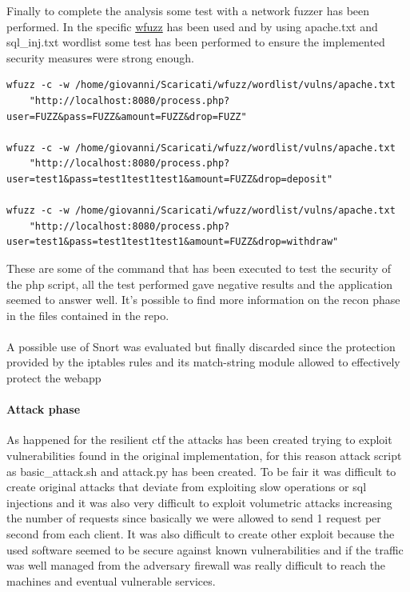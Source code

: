 \documentclass[14pt]{article}
\begin{document}
Finally to complete the analysis some test with a network fuzzer has been performed. In the specific \href{https://github.com/xmendez/wfuzz}{wfuzz} has been used and by using apache.txt and sql\_inj.txt wordlist some test has been performed to ensure the implemented security measures were strong enough. 
\begin{verbatim}
wfuzz -c -w /home/giovanni/Scaricati/wfuzz/wordlist/vulns/apache.txt 
	"http://localhost:8080/process.php?user=FUZZ&pass=FUZZ&amount=FUZZ&drop=FUZZ"

wfuzz -c -w /home/giovanni/Scaricati/wfuzz/wordlist/vulns/apache.txt 
	"http://localhost:8080/process.php?user=test1&pass=test1test1test1&amount=FUZZ&drop=deposit"

wfuzz -c -w /home/giovanni/Scaricati/wfuzz/wordlist/vulns/apache.txt 
	"http://localhost:8080/process.php?user=test1&pass=test1test1test1&amount=FUZZ&drop=withdraw"
\end{verbatim}
These are some of the command that has been executed to test the security of the php script, all the test performed gave negative results and the application seemed to answer well.
It's possible to find more information on the recon phase in the files contained in the repo.
\\
\\
A possible use of Snort was evaluated but finally discarded since the protection provided by the iptables rules and its match-string module allowed to effectively protect the webapp

\paragraph{Attack phase}
As happened for the resilient ctf the attacks has been created trying to exploit vulnerabilities found in the original implementation, for this reason attack script as basic\_attack.sh and attack.py has been created. To be fair it was difficult to create original attacks that deviate from exploiting slow operations or sql injections and it was also very difficult to exploit volumetric attacks increasing the number of requests since basically we were allowed to send 1 request per second from each client. It was also difficult to create other exploit because the used software seemed to be secure against known vulnerabilities and if the traffic was well managed from the adversary firewall was really difficult to reach the machines and eventual vulnerable services.
\end{document}
